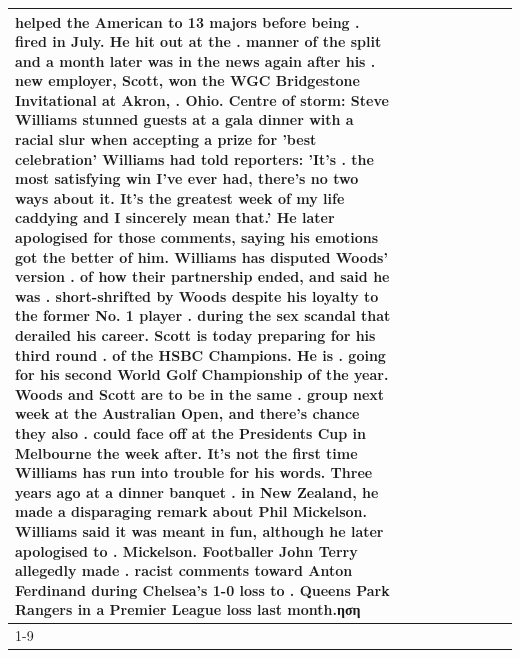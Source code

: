 \begin{table}[H]
\begin{tabular}{lllrlllll}
helped the American to 13 majors before being . fired in July. He hit out at the . manner of the split and a month later was in the news again after his . new employer, Scott, won the WGC Bridgestone Invitational at Akron, . Ohio. Centre of storm: Steve Williams stunned guests at a gala dinner with a racial slur when accepting a prize for 'best celebration' Williams had told reporters: 'It's . the most satisfying win I've ever had, there's no two ways about it. It's the greatest week of my life caddying and I sincerely mean that.' He later apologised for those comments, saying his emotions got the better of him. Williams has disputed Woods' version . of how their partnership ended, and said he was . short-shrifted by Woods despite his loyalty to the former No. 1 player . during the sex scandal that derailed his career. Scott is today preparing for his third round . of the HSBC Champions. He is . going for his second World Golf Championship of the year. Woods and Scott are to be in the same . group next week at the Australian Open, and there's chance they also . could face off at the Presidents Cup in Melbourne the week after. It's not the first time Williams has run into trouble for his words. Three years ago at a dinner banquet . in New Zealand, he made a disparaging remark about Phil Mickelson. Williams said it was meant in fun, although he later apologised to . Mickelson. Footballer John Terry allegedly made . racist comments toward Anton Ferdinand during Chelsea's 1-0 loss to . Queens Park Rangers in a Premier League loss last month.ηση \\
\cline{1-9}

\end{tabular}
\end{table}
